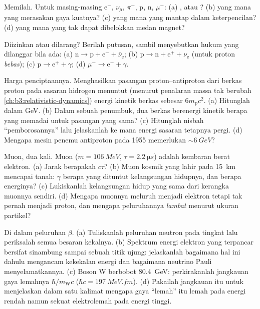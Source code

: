 \begin{exercise}[$\star$]\label{exo:b3:particle-physics:2}
Memilah. Untuk masing-masing e$^-$, $\nu_\mu$, $\pi^+$, p, n,
$\mu^-$: (a) ,  atau ? (b) yang mana yang merasakan gaya
kuatnya? (c) yang mana yang mantap dalam keterpencilan? (d) yang mana yang tak dapat
dibelokkan medan magnet?
\end{exercise}

\begin{exercise}[$\star$]\label{exo:b3:particle-physics:3}
Diizinkan atau dilarang? Berilah putusan, sambil menyebutkan hukum yang dilanggar bila ada:
(a) $\text{n} \to \text{p} + \text{e}^- + \bar\nu_{\text{e}}$;
(b) $\text{p} \to \text{n} + \text{e}^+ + \nu_{\text{e}}$ (untuk
proton \emph{bebas});
(c) $\text{p} \to \text{e}^+ + \gamma$;
(d) $\mu^- \to \text{e}^- + \gamma$.
\end{exercise}

\begin{exercise}[$\star$]\label{exo:b3:particle-physics:4}
Harga penciptaannya. Menghasilkan pasangan proton--antiproton dari
berkas proton pada sasaran hidrogen menuntut (menurut
penalaran massa tak berubah \cref{ch:b3:relativistic-dynamics})
energi kinetik berkas sebesar $6m_{\text{p}}c^2$. (a) Hitunglah dalam GeV.
(b) Dalam sebuah penumbuk, dua berkas berenergi kinetik berapa yang memadai untuk
pasangan yang sama? (c) Hitunglah nisbah ``pemborosannya'' lalu jelaskanlah ke mana
energi sasaran tetapnya pergi. (d) Mengapa mesin penemu antiproton pada 1955
memerlukan $\sim\qty{6}{GeV}$?
\end{exercise}

\begin{exercise}[$\star\star$]\label{exo:b3:particle-physics:5}
Muon, dua kali. Muon ($m = \qty{106}{MeV}$,
$\tau = \qty{2.2}{\micro s}$) adalah kembaran berat elektron. (a)
Jarak berapakah $c\tau$? (b) Muon kosmik yang lahir pada
\qty{15}{km} mencapai tanah: $\gamma$ berapa yang dituntut
kelangsungan hidupnya, dan berapa energinya? (c) Lukiskanlah kelangsungan hidup
yang sama dari kerangka muonnya sendiri. (d) Mengapa muonnya meluruh menjadi
elektron tetapi tak pernah menjadi proton, dan mengapa peluruhannya
\emph{lambat} menurut ukuran partikel?
\end{exercise}

\begin{exercise}[$\star\star$]\label{exo:b3:particle-physics:6}
Di dalam peluruhan $\beta$. (a) Tuliskanlah peluruhan neutron pada tingkat
 lalu periksalah semua besaran kekalnya. (b) Spektrum energi
elektron yang terpancar bersifat sinambung sampai sebuah titik ujung:
jelaskanlah bagaimana hal ini dahulu mengancam kekekalan energi dan bagaimana
neutrino Pauli menyelamatkannya. (c) Boson W berbobot
\qty{80.4}{GeV}: perkirakanlah jangkauan gaya lemahnya
$\hbar/m_{\text{W}}c$ ($\hbar c = \qty{197}{MeV.fm}$). (d) Pakailah
jangkauan itu untuk menjelaskan dalam satu kalimat mengapa gaya ``lemah'' itu
lemah pada energi rendah namun sekuat elektrolemah pada energi tinggi.
\end{exercise}

